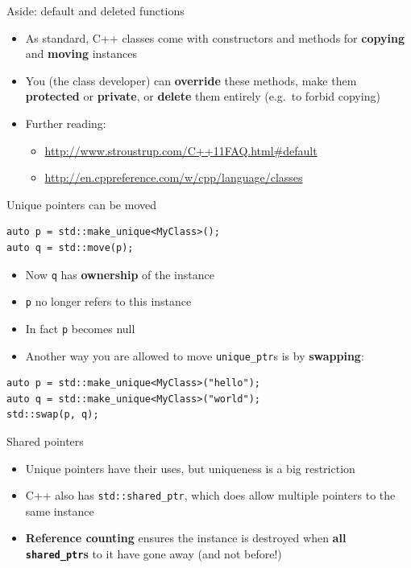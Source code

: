 \begin{frame}[fragile]{Aside: default and deleted functions}
    \begin{itemize}
        \item As standard, C++ classes come with constructors and methods for \textbf{copying} and \textbf{moving} instances \pause
        \item You (the class developer) can \textbf{override} these methods, make them \textbf{protected} or \textbf{private},
            or \textbf{delete} them entirely (e.g.\ to forbid copying) \pause
        \item Further reading:
            \begin{itemize}
                \item \url{http://www.stroustrup.com/C++11FAQ.html#default}
                \item \url{http://en.cppreference.com/w/cpp/language/classes}
            \end{itemize}
    \end{itemize}
\end{frame}

\begin{frame}[fragile]{Unique pointers can be moved}
    \begin{lstlisting}
auto p = std::make_unique<MyClass>();
auto q = std::move(p);
    \end{lstlisting} \pause
    \begin{itemize}
        \item Now \lstinline{q} has \textbf{ownership} of the instance \pause
        \item \lstinline{p} no longer refers to this instance \pause
        \item In fact \lstinline{p} becomes null \pause
        \item Another way you are allowed to move \lstinline{unique_ptr}s is by \textbf{swapping}:
    \end{itemize}
    \begin{lstlisting}
auto p = std::make_unique<MyClass>("hello");
auto q = std::make_unique<MyClass>("world");
std::swap(p, q);
    \end{lstlisting}
\end{frame}

\begin{frame}{Shared pointers}
    \begin{itemize}
        \item Unique pointers have their uses, but uniqueness is a big restriction \pause
        \item C++ also has \lstinline{std::shared_ptr}, which does allow multiple pointers to the same
            instance \pause
        \item \textbf{Reference counting} ensures the instance is destroyed when
            \textbf{all \lstinline{shared_ptr}s} to it have gone away (and not before!)
    \end{itemize}
\end{frame}

